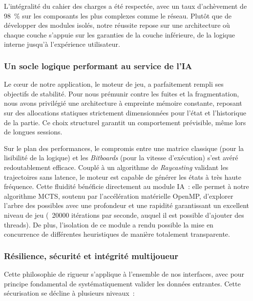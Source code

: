 \documentclass[a4paper]{article}
\begin{document}
L'intégralité du cahier des charges a été respectée, avec un taux d'achèvement de 98~\% sur les composants les plus complexes comme le réseau. Plutôt que de développer des modules isolés, notre réussite repose sur une architecture où chaque couche s'appuie sur les garanties de la couche inférieure, de la logique interne jusqu'à l'expérience utilisateur.

\subsubsection{Un socle logique performant au service de l'IA}

Le cœur de notre application, le moteur de jeu, a parfaitement rempli ses objectifs de stabilité. Pour nous prémunir contre les fuites et la fragmentation, nous avons privilégié une architecture à empreinte mémoire constante, reposant sur des allocations statiques strictement dimensionnées pour l'état et l'historique de la partie. Ce choix structurel garantit un comportement prévisible, même lors de longues sessions.

Sur le plan des performances, le compromis entre une matrice classique (pour la lisibilité de la logique) et les \textit{Bitboards} (pour la vitesse d'exécution) s'est avéré redoutablement efficace. Couplé à un algorithme de \textit{Raycasting} validant les trajectoires sans latence, le moteur est capable de générer les états à très haute fréquence. Cette fluidité bénéficie directement au module IA~: elle permet à notre algorithme MCTS, soutenu par l'accélération matérielle OpenMP, d'explorer l'arbre des possibles avec une profondeur et une rapidité garantissant un excellent niveau de jeu (~20000 itérations par seconde, auquel il est possible d'ajouter des threads). De plus, l'isolation de ce module a rendu possible la mise en concurrence de différentes heuristiques de manière totalement transparente.

\subsubsection{Résilience, sécurité et intégrité multijoueur}

Cette philosophie de rigueur s'applique à l'ensemble de nos interfaces, avec pour principe fondamental de systématiquement valider les données entrantes. Cette sécurisation se décline à plusieurs niveaux~:
\end{document}
